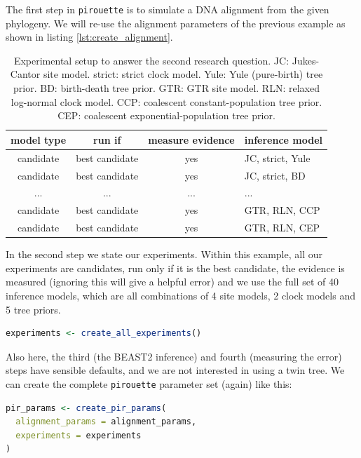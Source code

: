 \documentclass{article}
\begin{document}
The first step in \verb;pirouette; is to simulate a DNA alignment from the given phylogeny. We will re-use the alignment parameters of the previous example as shown in listing \ref{lst:create_alignment}.

\begin{table}
  \begin{tabular}{ | c | c | c | l | }
    \hline
    \textbf{model type} & \textbf{run if} & \textbf{measure evidence} & \textbf{inference model} \\ 
    \hline
    candidate & best candidate & yes & JC, strict, Yule \\
    candidate & best candidate & yes & JC, strict, BD \\
    ...       & ...            & ... & ... \\
    candidate & best candidate & yes & GTR, RLN, CCP \\
    candidate & best candidate & yes & GTR, RLN, CEP \\
    \hline
  \end{tabular}
  \caption{
    Experimental setup to answer the second research question.
    JC: Jukes-Cantor site model.
    strict: strict clock model.
    Yule: Yule (pure-birth) tree prior.
    BD: birth-death tree prior.
    GTR: GTR site model.
    RLN: relaxed log-normal clock model.
    CCP: coalescent constant-population tree prior.
    CEP: coalescent exponential-population tree prior.
  }
\end{table}

In the second step we state our experiments. 
Within this example, all our experiments are candidates,
run only if it is the best candidate, the evidence is measured (ignoring
this will give a helpful error) and we use the full set of 
40 inference models, which are all combinations of 4 site 
models, 2 clock models and 5 tree priors.

\begin{lstlisting}[language=R, floatplacement=H, frame=single]
experiments <- create_all_experiments()
\end{lstlisting}

Also here, the third (the BEAST2 inference) and fourth (measuring the error)
steps have sensible defaults, and we are not
interested in using a twin tree. We can create the complete
\verb;pirouette; parameter set (again) like this:

\begin{lstlisting}[language=R, floatplacement=H, frame=single]
pir_params <- create_pir_params(
  alignment_params = alignment_params,
  experiments = experiments
)
\end{lstlisting}
\end{document}
